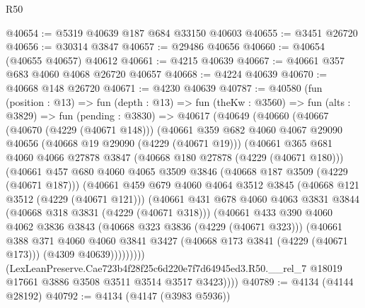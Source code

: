 \begin{lexlean}{R50}
\begin{coremodule}
@40654 := @5319 @40639 @187 @684 @33150 @40603
@40655 := @3451 @26720
@40656 := @30314 @3847
@40657 := @29486 @40656
@40660 := @40654 (@40655 @40657) @40612
@40661 := @4215 @40639
@40667 := @40661 @357 @683 @4060 @4068 @26720 @40657
@40668 := @4224 @40639
@40670 := @40668 @148 @26720
@40671 := @4230 @40639
@40787 := @40580
    (fun (position : @13) =>
    fun (depth : @13) =>
    fun (theKw : @3560) =>
    fun (alts : @3829) =>
    fun (pending : @3830) =>
    @40617
      (@40649
        (@40660
          (@40667
            (@40670 (@4229 (@40671 @148)))
            (@40661
              @359
              @682
              @4060
              @4067
              @29090
              @40656
              (@40668 @19 @29090 (@4229 (@40671 @19)))
              (@40661
                @365
                @681
                @4060
                @4066
                @27878
                @3847
                (@40668 @180 @27878 (@4229 (@40671 @180)))
                (@40661
                  @457
                  @680
                  @4060
                  @4065
                  @3509
                  @3846
                  (@40668 @187 @3509 (@4229 (@40671 @187)))
                  (@40661
                    @459
                    @679
                    @4060
                    @4064
                    @3512
                    @3845
                    (@40668 @121 @3512 (@4229 (@40671 @121)))
                    (@40661
                      @431
                      @678
                      @4060
                      @4063
                      @3831
                      @3844
                      (@40668 @318 @3831 (@4229 (@40671 @318)))
                      (@40661
                        @433
                        @390
                        @4060
                        @4062
                        @3836
                        @3843
                        (@40668 @323 @3836 (@4229 (@40671 @323)))
                        (@40661
                          @388
                          @371
                          @4060
                          @4060
                          @3841
                          @3427
                          (@40668 @173 @3841 (@4229 (@40671 @173)))
                          (@4309 @40639)))))))))
          (LexLeanPreserve.Cae723b4f28f25c6d220e7f7d64945ed3.R50.__rel_7
            @18019
            @17661
            @3886
            @3508
            @3511
            @3514
            @3517
            @3423))))
@40789 := @4134 (@4144 @28192)
@40792 := @4134 (@4147 (@3983 @5936))

\end{coremodule}
\end{lexlean}
